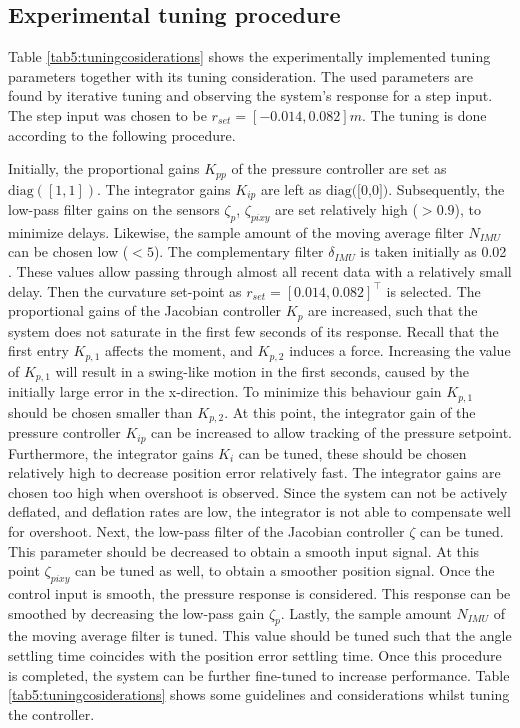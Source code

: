\subsection*{Experimental tuning procedure}


Table \ref{tab5:tuningcosiderations} shows the experimentally implemented tuning parameters together with its tuning consideration. The used parameters are found by iterative tuning and observing the system's response for a step input. The step input was chosen to be $r_{set} = [-0.014,0.082]m$. The tuning is done according to the following procedure.

Initially, the proportional gains $K_{pp}$ of the pressure controller are set as $\text{diag}([1,1])$. The integrator gains $K_{ip}$ are left as $\text{diag([0,0])}$. Subsequently, the low-pass filter gains on the sensors $\zeta_p$, $\zeta_{pixy}$ are set relatively high ($>0.9$), to minimize delays. Likewise, the sample amount of the moving average filter $N_{IMU}$ can be chosen low ($<5$). The complementary filter $\delta_{IMU}$ is taken initially as 0.02 \cite{compfilter}. These values allow passing through almost all recent data with a relatively small delay. Then the curvature set-point as $r_{set} = [0.014,0.082]^\top$ is selected. The proportional gains of the Jacobian controller $K_p$ are increased, such that the system does not saturate in the first few seconds of its response. Recall that the first entry $K_{p,1}$ affects the moment, and $K_{p,2}$ induces a force. Increasing the value of $K_{p,1}$ will result in a swing-like motion in the first seconds, caused by the initially large error in the x-direction. To minimize this behaviour gain $K_{p,1}$ should be chosen smaller than $K_{p,2}$. At this point, the integrator gain of the pressure controller $K_{ip}$ can be increased to allow tracking of the pressure setpoint. Furthermore, the integrator gains $K_i$ can be tuned, these should be chosen relatively high to decrease position error relatively fast. The integrator gains are chosen too high when overshoot is observed. Since the system can not be actively deflated, and deflation rates are low, the integrator is not able to compensate well for overshoot. Next, the low-pass filter of the Jacobian controller $\zeta$ can be tuned. This parameter should be decreased to obtain a smooth input signal. At this point $\zeta_{pixy}$ can be tuned as well, to obtain a smoother position signal. Once the control input is smooth, the pressure response is considered. This response can be smoothed by decreasing the low-pass gain $\zeta_p$. Lastly, the sample amount $N_{IMU}$ of the moving average filter is tuned. This value should be tuned such that the angle settling time coincides with the position error settling time. Once this procedure is completed, the system can be further fine-tuned to increase performance. Table \ref{tab5:tuningcosiderations} shows some guidelines and considerations whilst tuning the controller.



